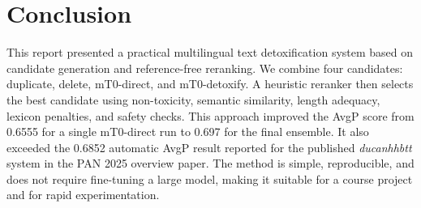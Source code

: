 \documentclass{article}
\begin{document}
\section{Conclusion}

This report presented a practical multilingual text detoxification system based on candidate generation and reference-free reranking. We combine four candidates: duplicate, delete, mT0-direct, and mT0-detoxify. A heuristic reranker then selects the best candidate using non-toxicity, semantic similarity, length adequacy, lexicon penalties, and safety checks. This approach improved the AvgP score from 0.6555 for a single mT0-direct run to 0.697 for the final ensemble. It also exceeded the 0.6852 automatic AvgP result reported for the published \textit{ducanhhbtt} system in the PAN 2025 overview paper. The method is simple, reproducible, and does not require fine-tuning a large model, making it suitable for a course project and for rapid experimentation.
\end{document}
